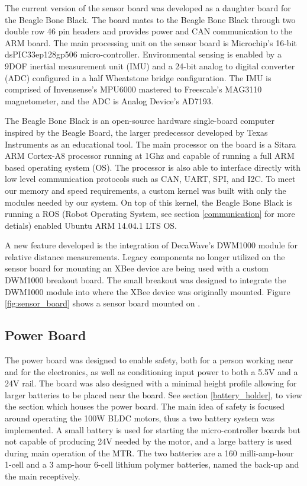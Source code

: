The current version of the sensor board was developed as a daughter board for the Beagle Bone Black.
The board mates to the Beagle Bone Black through two double row 46 pin headers and provides power and CAN communication to the ARM board.
The main processing unit on the sensor board is Microchip's 16-bit dsPIC33ep128gp506 micro-controller.
Environmental sensing is enabled by a 9DOF inertial measurement unit (IMU) and a 24-bit analog to digital converter (ADC) configured in a half Wheatstone bridge configuration.
The IMU is comprised of Invensense's MPU6000 mastered to Freescale's MAG3110 magnetometer, and the ADC is Analog Device's AD7193.

The Beagle Bone Black is an open-source hardware single-board computer inspired by the Beagle Board, the larger predecessor developed by Texas Instruments as an educational tool.
The main processor on the board is a Sitara ARM Cortex-A8 processor running at 1Ghz and capable of running a full ARM based operating system (OS).
The processor is also able to interface directly with low level communication protocols such as CAN, UART, SPI, and I2C.
To meet our memory and speed requirements, a custom kernel was built with only the modules needed by our system.
On top of this kernel, the Beagle Bone Black is running a ROS (Robot Operating System, see section \ref{communication} for more detials) enabled Ubuntu ARM 14.04.1 LTS OS.

A new feature developed is the integration of DecaWave's DWM1000 module for relative distance measurements.
Legacy components no longer utilized on the sensor board for mounting an XBee device are being used with a custom DWM1000 breakout board.
The small breakout was designed to integrate the DWM1000 module into where the XBee device was originally mounted.
Figure \ref{fig:sensor_board} shows a sensor board mounted on \SB{}.

\subsection{Power Board}
\label{power_board}
The power board was designed to enable safety, both for a person working near \SB{} and for the electronics, as well as conditioning input power to both a 5.5V and a 24V rail.
The board was also designed with a minimal height profile allowing for larger batteries to be placed near the board.
See section \ref{battery_holder}, to view the section which houses the power board.
The main idea of safety is focused around operating the 100W BLDC motors, thus a two battery system was implemented.
A small battery is used for starting the micro-controller boards but not capable of producing 24V needed by the motor, and a large battery is used during main operation of the MTR.
The two batteries are a 160 milli-amp-hour 1-cell and a 3 amp-hour 6-cell lithium polymer batteries, named the back-up and the main receptively.

